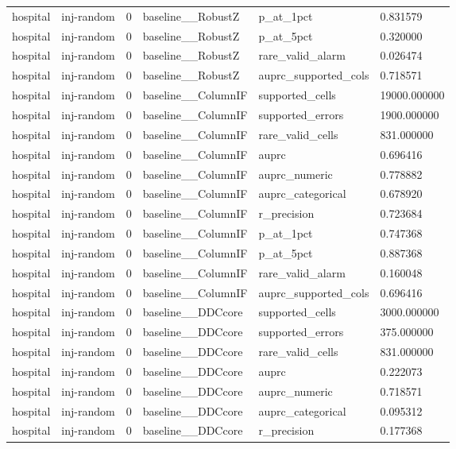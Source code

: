 \begin{tabular}{llllll}
hospital & inj-random & 0 & baseline\_\_RobustZ & p\_at\_1pct & 0.831579 \\
hospital & inj-random & 0 & baseline\_\_RobustZ & p\_at\_5pct & 0.320000 \\
hospital & inj-random & 0 & baseline\_\_RobustZ & rare\_valid\_alarm & 0.026474 \\
hospital & inj-random & 0 & baseline\_\_RobustZ & auprc\_supported\_cols & 0.718571 \\
hospital & inj-random & 0 & baseline\_\_ColumnIF & supported\_cells & 19000.000000 \\
hospital & inj-random & 0 & baseline\_\_ColumnIF & supported\_errors & 1900.000000 \\
hospital & inj-random & 0 & baseline\_\_ColumnIF & rare\_valid\_cells & 831.000000 \\
hospital & inj-random & 0 & baseline\_\_ColumnIF & auprc & 0.696416 \\
hospital & inj-random & 0 & baseline\_\_ColumnIF & auprc\_numeric & 0.778882 \\
hospital & inj-random & 0 & baseline\_\_ColumnIF & auprc\_categorical & 0.678920 \\
hospital & inj-random & 0 & baseline\_\_ColumnIF & r\_precision & 0.723684 \\
hospital & inj-random & 0 & baseline\_\_ColumnIF & p\_at\_1pct & 0.747368 \\
hospital & inj-random & 0 & baseline\_\_ColumnIF & p\_at\_5pct & 0.887368 \\
hospital & inj-random & 0 & baseline\_\_ColumnIF & rare\_valid\_alarm & 0.160048 \\
hospital & inj-random & 0 & baseline\_\_ColumnIF & auprc\_supported\_cols & 0.696416 \\
hospital & inj-random & 0 & baseline\_\_DDCcore & supported\_cells & 3000.000000 \\
hospital & inj-random & 0 & baseline\_\_DDCcore & supported\_errors & 375.000000 \\
hospital & inj-random & 0 & baseline\_\_DDCcore & rare\_valid\_cells & 831.000000 \\
hospital & inj-random & 0 & baseline\_\_DDCcore & auprc & 0.222073 \\
hospital & inj-random & 0 & baseline\_\_DDCcore & auprc\_numeric & 0.718571 \\
hospital & inj-random & 0 & baseline\_\_DDCcore & auprc\_categorical & 0.095312 \\
hospital & inj-random & 0 & baseline\_\_DDCcore & r\_precision & 0.177368 \\

\end{tabular}
